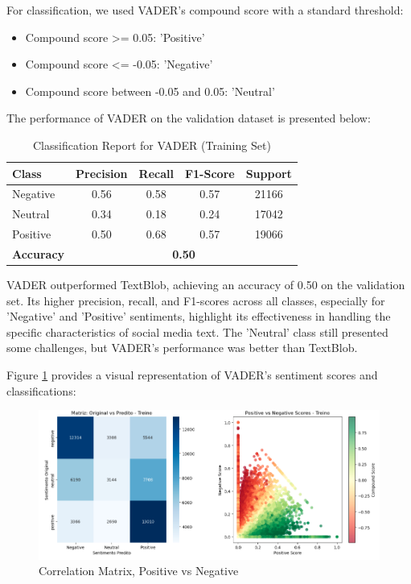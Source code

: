 For classification, we used VADER's compound score with a standard threshold:
\begin{itemize}
    \item Compound score >= 0.05: 'Positive'
    \item Compound score <= -0.05: 'Negative'
    \item Compound score between -0.05 and 0.05: 'Neutral'
\end{itemize}

The performance of VADER on the validation dataset is presented below:

\begin{table}[H]
\centering
\caption{Classification Report for VADER (Training Set)}
\begin{tabular}{|l|c|c|c|c|}
\hline
\textbf{Class} & \textbf{Precision} & \textbf{Recall} & \textbf{F1-Score} & \textbf{Support} \\
\hline
Negative & 0.56 & 0.58 & 0.57 & 21166 \\
Neutral  & 0.34 & 0.18 & 0.24 & 17042 \\
Positive & 0.50 & 0.68 & 0.57 & 19066 \\
\hline
\textbf{Accuracy} & \multicolumn{4}{|c|}{\textbf{0.50}} \\
\hline
\end{tabular}
\label{tab:vader_training_report}
\end{table}


VADER outperformed TextBlob, achieving an accuracy of 0.50 on the validation set. Its higher precision, recall, and F1-scores across all classes, especially for 'Negative' and 'Positive' sentiments, highlight its effectiveness in handling the specific characteristics of social media text. The 'Neutral' class still presented some challenges, but VADER's performance was better than TextBlob.

Figure \ref{fig:vader_analysis} provides a visual representation of VADER's sentiment scores and classifications:

\begin{figure}[H]
    \centering
    \includegraphics[width=1\linewidth]{images/vader.png}
    \caption{Correlation Matrix, Positive vs Negative}
    \label{fig:vader_analysis}
\end{figure}

